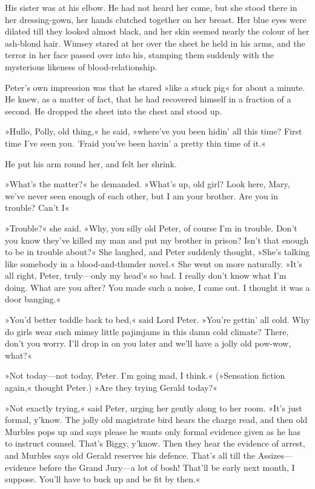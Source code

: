 His sister was at his elbow. He had not heard her come, but she stood there in her dressing-gown, her hands clutched together on her breast.  Her blue eyes were dilated till they looked almost black, and her skin seemed nearly the colour of her ash-blond hair. Wimsey stared at her over the sheet he held in his arms, and the terror in her face passed over into his, stamping them suddenly with the mysterious likeness of blood-relationship.

Peter's own impression was that he stared »like a stuck pig« for about a minute. He knew, as a matter of fact, that he had recovered himself in a fraction of a second. He dropped the sheet into the chest and stood up.

»Hullo, Polly, old thing,« he said, »where've you been hidin' all this time? First time I've seen you. 'Fraid you've been havin' a pretty thin time of it.«

He put his arm round her, and felt her shrink.

»What's the matter?« he demanded. »What's up, old girl? Look here, Mary, we've never seen enough of each other, but I am your brother. Are you in trouble? Can't I\longdash«

»Trouble?« she said. »Why, you silly old Peter, of course I'm in trouble. Don't you know they've killed my man and put my brother in prison? Isn't that enough to be in trouble about?« She laughed, and Peter suddenly thought, »She's talking like somebody in a blood-and-thunder novel.« She went on more naturally. »It's all right, Peter, truly—only my head's so bad. I really don't know what I'm doing. What are you after? You made such a noise, I came out. I thought it was a door banging.«

»You'd better toddle back to bed,« said Lord Peter. »You're gettin' all cold. Why do girls wear such mimsy little pajimjams in this damn cold climate? There, don't you worry. I'll drop in on you later and we'll have a jolly old pow-wow, what?«

»Not today—not today, Peter. I'm going mad, I think.« (»Sensation fiction again,« thought Peter.) »Are they trying Gerald today?«

»Not exactly trying,« said Peter, urging her gently along to her room.  »It's just formal, y'know. The jolly old magistrate bird hears the charge read, and then old Murbles pops up and says please he wants only formal evidence given as he has to instruct counsel. That's Biggy, y'know. Then they hear the evidence of arrest, and Murbles says old Gerald reserves his defence. That's all till the Assizes—evidence before the Grand Jury—a lot of bosh! That'll be early next month, I suppose. You'll have to buck up and be fit by then.«

